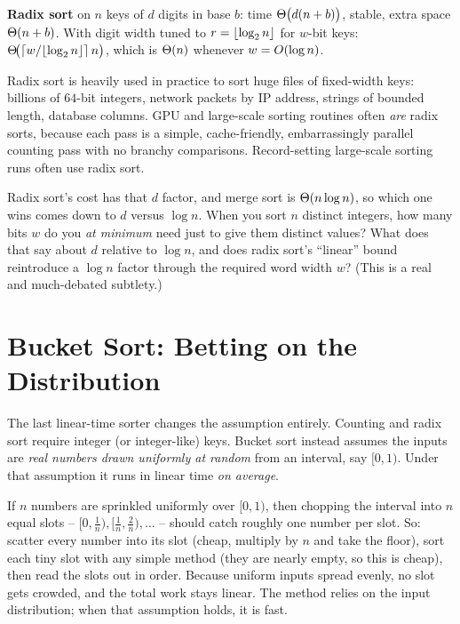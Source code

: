 \begin{complexitybox}
\textbf{Radix sort} on $n$ keys of $d$ digits in base $b$: time
$\Theta\bigl(d(n+b)\bigr)$, stable, extra space $\Theta(n + b)$. With digit width
tuned to $r=\lfloor\log_2 n\rfloor$ for $w$-bit keys: $\Theta\!\bigl(\lceil w/\lfloor\log_2 n\rfloor\rceil\,n\bigr)$,
which is $\Theta(n)$ whenever $w = O(\log n)$.
\end{complexitybox}

\begin{aestheticbox}
Radix sort is heavily used in practice to sort huge files of fixed-width
keys: billions of $64$-bit integers, network packets by IP address,
strings of bounded length, database columns. GPU and large-scale sorting
routines often \emph{are} radix sorts, because each pass is a simple,
cache-friendly, embarrassingly parallel counting pass with no branchy
comparisons. Record-setting large-scale sorting runs often
use radix sort.
\end{aestheticbox}

\begin{walkbox}
Radix sort's cost has that $d$ factor, and merge sort is
$\Theta(n \log n)$, so which one wins comes down to $d$ versus $\log n$. When
you sort $n$ distinct integers, how many bits $w$ do you \emph{at minimum} need
just to give them distinct values? What does that say about $d$ relative to
$\log n$, and does radix sort's ``linear'' bound reintroduce a
$\log n$ factor through the required word width $w$? (This is a real and much-debated
subtlety.)
\end{walkbox}

\section{Bucket Sort: Betting on the Distribution}

The last linear-time sorter changes the assumption entirely. Counting and radix
sort require integer (or integer-like) keys. Bucket sort instead assumes the
inputs are \emph{real numbers drawn uniformly at random} from an interval, say
$[0, 1)$. Under that assumption it runs in linear time \emph{on average}.

\begin{intuitionbox}
If $n$ numbers are sprinkled uniformly over $[0,1)$, then chopping the interval
into $n$ equal slots -- $[0, \tfrac1n), [\tfrac1n, \tfrac2n), \dots$ -- should
catch roughly one number per slot. So: scatter every number into its slot
(cheap, multiply by $n$ and take the floor), sort each tiny slot with any
simple method (they are nearly empty, so this is cheap), then read the slots out
in order. Because uniform inputs spread evenly, no slot gets crowded, and the
total work stays linear. The method relies on the input distribution; when
that assumption holds, it is fast.
\end{intuitionbox}

